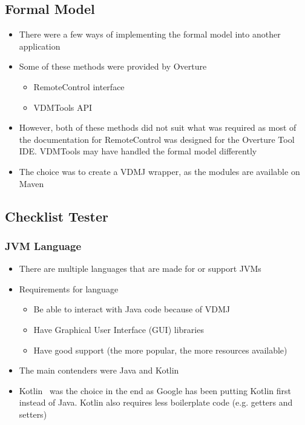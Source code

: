 \documentclass[../dissertation.tex]{subfiles}
\begin{document}
\subsection{Formal Model}
\begin{itemize}
  \item There were a few ways of implementing the formal model into another application
  \item Some of these methods were provided by Overture~\cite{overture-remote}
    \begin{itemize}
      \item RemoteControl interface
      \item VDMTools API~\cite{vdmtoolbox-api}
    \end{itemize}
  \item However, both of these methods did not suit what was required as most of the
    documentation for RemoteControl was designed for the Overture Tool IDE. VDMTools
    may have handled the formal model differently
  \item The choice was to create a VDMJ wrapper, as the modules are available on Maven
\end{itemize}

\subsection{Checklist Tester}
\subsubsection{JVM Language}
\begin{itemize}
  \item There are multiple languages that are made for or support JVMs~\cite{jvm-alt-lang}
  \item Requirements for language
    \begin{itemize}
      \item Be able to interact with Java code because of VDMJ
      \item Have Graphical User Interface (GUI) libraries
      \item Have good support (the more popular, the more resources available)
    \end{itemize}
  \item The main contenders were Java and Kotlin~\cite{kotlin}
  \item Kotlin~\cite{kotlin} was the choice in the end as Google has been putting Kotlin first
    instead of Java. Kotlin also requires less boilerplate code (e.g. getters and setters)~\cite{android-kotlin}

\end{itemize}
\end{document}
